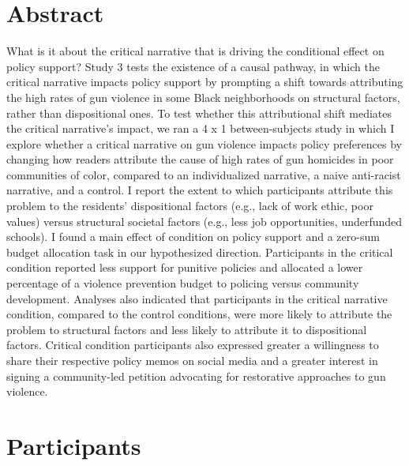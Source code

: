 \documentclass[
]{book}
\begin{document}
\hypertarget{abstract-1}{%
\section*{Abstract}\label{abstract-1}}

What is it about the critical narrative that is driving the conditional effect on policy support? Study 3 tests the existence of a causal pathway, in which the critical narrative impacts policy support by prompting a shift towards attributing the high rates of gun violence in some Black neighborhoods on structural factors, rather than dispositional ones. To test whether this attributional shift mediates the critical narrative's impact, we ran a 4 x 1 between-subjects study in which I explore whether a critical narrative on gun violence impacts policy preferences by changing how readers attribute the cause of high rates of gun homicides in poor communities of color, compared to an individualized narrative, a naive anti-racist narrative, and a control. I report the extent to which participants attribute this problem to the residents' dispositional factors (e.g., lack of work ethic, poor values) versus structural societal factors (e.g., less job opportunities, underfunded schools). I found a main effect of condition on policy support and a zero-sum budget allocation task in our hypothesized direction. Participants in the critical condition reported less support for punitive policies and allocated a lower percentage of a violence prevention budget to policing versus community development. Analyses also indicated that participants in the critical narrative condition, compared to the control conditions, were more likely to attribute the problem to structural factors and less likely to attribute it to dispositional factors. Critical condition participants also expressed greater a willingness to share their respective policy memos on social media and a greater interest in signing a community-led petition advocating for restorative approaches to gun violence.

\hypertarget{participants-2}{%
\section{Participants}\label{participants-2}}
\end{document}
